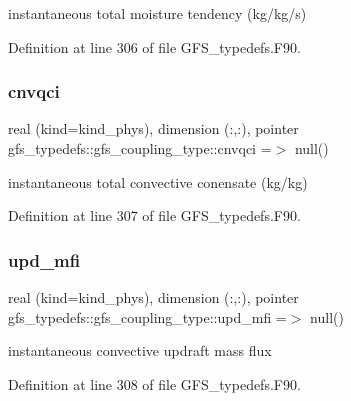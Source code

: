 instantaneous total moisture tendency (kg/kg/s) 



Definition at line 306 of file G\+F\+S\+\_\+typedefs.\+F90.

\mbox{\label{structgfs__typedefs_1_1gfs__coupling__type_a493adc200502b6e3378b1b45bb03cdd3}} 
\subsubsection{cnvqci}
{\footnotesize\ttfamily real (kind=kind\+\_\+phys), dimension  (\+:,\+:), pointer gfs\+\_\+typedefs\+::gfs\+\_\+coupling\+\_\+type\+::cnvqci =$>$ null()}



instantaneous total convective conensate (kg/kg) 



Definition at line 307 of file G\+F\+S\+\_\+typedefs.\+F90.

\mbox{\label{structgfs__typedefs_1_1gfs__coupling__type_a03386881aeafd52f01eb9dc5b5fea16c}} 
\subsubsection{upd\+\_\+mfi}
{\footnotesize\ttfamily real (kind=kind\+\_\+phys), dimension (\+:,\+:), pointer gfs\+\_\+typedefs\+::gfs\+\_\+coupling\+\_\+type\+::upd\+\_\+mfi =$>$ null()}



instantaneous convective updraft mass flux 



Definition at line 308 of file G\+F\+S\+\_\+typedefs.\+F90.

\mbox{\label{structgfs__typedefs_1_1gfs__coupling__type_afab0f45fb14468d85b62398a8368a27e}} 
